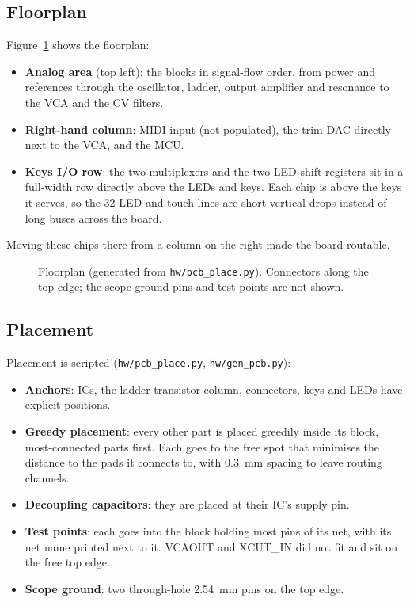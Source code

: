 \documentclass[11pt,a4paper]{article}
\newcommand{\file}[1]{\texttt{#1}}
\begin{document}
\subsection{Floorplan}
Figure~\ref{fig:floor} shows the floorplan:
\begin{itemize}
  \item \textbf{Analog area} (top left): the blocks in signal-flow order, from power and references
    through the oscillator, ladder, output amplifier and resonance to the VCA and the CV filters.
  \item \textbf{Right-hand column}: MIDI input (not populated), the trim DAC directly next to the VCA, and
    the MCU.
  \item \textbf{Keys I/O row}: the two multiplexers and the two LED shift registers sit in a full-width row
    directly above the LEDs and keys. Each chip is above the keys it serves, so the 32 LED and touch lines
    are short vertical drops instead of long buses across the board.
\end{itemize}
Moving these chips there from a column on the right made the board routable.

\begin{figure}[ht]
\centering

\caption{Floorplan (generated from \file{hw/pcb\_place.py}). Connectors along the top edge; the scope
ground pins and test points are not shown.}
\label{fig:floor}
\end{figure}

\subsection{Placement}
Placement is scripted (\file{hw/pcb\_place.py}, \file{hw/gen\_pcb.py}):
\begin{itemize}
  \item \textbf{Anchors}: ICs, the ladder transistor column, connectors, keys and LEDs have explicit
    positions.
  \item \textbf{Greedy placement}: every other part is placed greedily inside its block, most-connected
    parts first. Each goes to the free spot that minimises the distance to the pads it connects to, with
    \SI{0.3}{mm} spacing to leave routing channels.
  \item \textbf{Decoupling capacitors}: they are placed at their IC's supply pin.
  \item \textbf{Test points}: each goes into the block holding most pins of its net, with its net name
    printed next to it. VCAOUT and XCUT\_IN did not fit and sit on the free top edge.
  \item \textbf{Scope ground}: two through-hole \SI{2.54}{mm} pins on the top edge.
\end{itemize}
\end{document}
